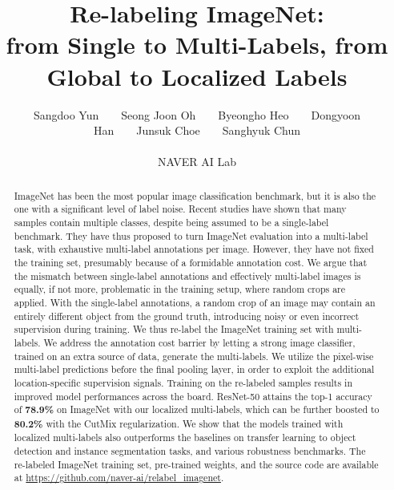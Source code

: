 \documentclass[final]{cvpr}
\begin{document}
\title{
Re-labeling ImageNet: \\ from Single to Multi-Labels, from Global to Localized Labels}


\author{
Sangdoo Yun~~~~Seong Joon Oh~~~~Byeongho Heo~~~~Dongyoon Han~~~~Junsuk Choe~~~~Sanghyuk Chun\\
~~\\
NAVER AI Lab\\
}

\maketitle


\begin{abstract}
ImageNet has been the most popular image classification benchmark, but it is also the one with a significant level of label noise. Recent studies have shown that many samples contain multiple classes, despite being assumed to be a single-label benchmark. They have thus proposed to turn ImageNet evaluation into a multi-label task, with exhaustive multi-label annotations per image. However, they have not fixed the training set, presumably because of a formidable annotation cost. 
We argue that the mismatch between single-label annotations and effectively multi-label images is equally, if not more, problematic in the training setup, where random crops are applied. With the single-label annotations, a random crop of an image may contain an entirely different object from the ground truth, introducing noisy or even incorrect supervision during training. 
We thus re-label the ImageNet training set with multi-labels. We address the annotation cost barrier by letting a strong image classifier, trained on an extra source of data, generate the multi-labels. We utilize the pixel-wise multi-label predictions before the final pooling layer, in order to exploit the additional location-specific supervision signals. Training on the re-labeled samples results in improved model performances across the board. 
ResNet-50 attains the top-1 accuracy of \textbf{78.9\%} on ImageNet with our localized multi-labels, which can be further boosted to \textbf{80.2\%} with the CutMix regularization. We show that the models trained with localized multi-labels also outperforms the baselines on transfer learning to object detection and instance segmentation tasks, and various robustness benchmarks. The re-labeled ImageNet training set, pre-trained weights, and the source code are available at 
{\url{https://github.com/naver-ai/relabel_imagenet}}.
\end{abstract} 
\end{document}
